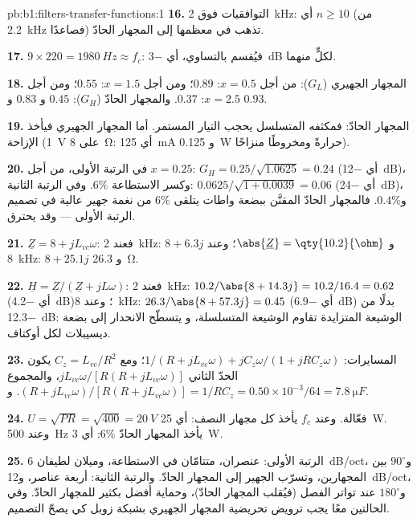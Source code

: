 \begin{solution}{pb:b1:filters-transfer-functions:1}
\textbf{16.} التوافقيات فوق \qty{2}{kHz}: أي $n \geq 10$ (من \qty{2.2}{kHz}
فصاعدًا) تذهب في معظمها إلى المجهار الحادّ.

\textbf{17.} $9 \times 220 = \qty{1980}{Hz} \approx f_c$: فيُقسم بالتساوي،
أي \qty{-3}{dB} لكلٍّ منهما.

\textbf{18.} المجهار الجهيري ($G_L$): من أجل $x = 0.5$: $0.89$؛ ومن أجل $x = 1.5$: $0.55$؛ ومن أجل $x = 2.5$:
$0.37$. والمجهار الحادّ ($G_H$): $0.45$ و $0.83$ و $0.93$.

\textbf{19.} المجهار الحادّ: فمكثفه المتسلسل يحجب التيار المستمر. أما المجهار الجهيري
فيأخذ الإزاحة (\qty{1}{V} على \qty{8}{\ohm}: أي \qty{125}{mA} و
\qty{0.125}{W} حرارةً ومخروطًا منزاحًا).

\textbf{20.} في الرتبة الأولى، من أجل $x = 0.25$: $G_H = 0.25/\sqrt{1.0625} = 0.24$
(أي \qty{-12}{dB})، وكسر الاستطاعة $6\%$. وفي الرتبة الثانية: $0.0625/\sqrt{1 +
0.0039} = 0.06$ (أي \qty{-24}{dB})، و$0.4\%$. فالمجهار الحادّ المقنَّن ببضعة واطات
يتلقى $6\%$ من نغمة جهير عالية في تصميم الرتبة الأولى --- وقد
يحترق.

\textbf{21.} $\underline Z = 8 + jL_{vc}\omega$: فعند \qty{2}{kHz}: $8 + 6.3j$ و
$\abs{\underline Z} = \qty{10.2}{\ohm}$؛ وعند \qty{8}{kHz}: $8 + 25.1j$ و
\qty{26.3}{\ohm}.

\textbf{22.} $\underline H = \underline Z/(\underline Z + jL\omega)$:
فعند \qty{2}{kHz}: $10.2/\abs{8 + 14.3j} = 10.2/16.4 = 0.62$ (أي \qty{-4.2}{dB})؛
وعند \qty{8}{kHz}: $26.3/\abs{8 + 57.3j} = 0.45$ (أي \qty{-6.9}{dB}) بدلًا من
\qty{-12.3}{dB}:  الوشيعة المتزايدة تقاوم الوشيعة المتسلسلة، و
يتسطّح الانحدار إلى بضعة ديسيبلات لكل أوكتاف.

\textbf{23.} المسايرات: $1/(R + jL_{vc}\omega) + jC_z\omega/(1 + jRC_z\omega)$؛
ومع $C_z = L_{vc}/R^2$ يكون الحدّ الثاني $jL_{vc}\omega/[R(R +
jL_{vc}\omega)]$، والمجموع $(R + jL_{vc}\omega)/[R(R + jL_{vc}\omega)]
= 1/R$. و$C_z = 0.50\times10^{-3}/64 = \qty{7.8}{\micro F}$.

\textbf{24.} $U = \sqrt{PR} = \sqrt{400} = \qty{20}{V}$ فعّالة. وعند $f_c$ يأخذ كل
مجهار النصف: أي \qty{25}{W}. وعند \qty{500}{Hz} يأخذ المجهار الحادّ $6\%$:
أي \qty{3}{W}.

\textbf{25.} الرتبة الأولى: عنصران، متتامّان في الاستطاعة، وميلان لطيفان
\qty{6}{dB/oct}، و$90^\circ$ بين المجهارين، وتسرّب الجهير إلى
المجهار الحادّ. والرتبة الثانية: أربعة عناصر، و\qty{12}{dB/oct}، و$180^\circ$ عند
تواتر الفصل (فيُقلب المجهار الحادّ)، وحماية أفضل بكثير للمجهار الحادّ. وفي
الحالتين معًا يجب ترويض تحريضية المجهار الجهيري بشبكة زوبل كي
يصحّ التصميم.
\end{solution}
